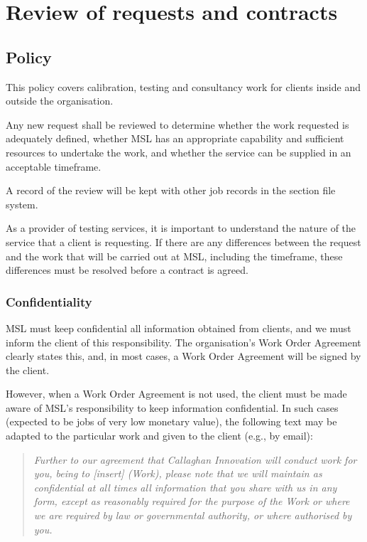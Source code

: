 \section{Review of requests and contracts}
\label{s:requests_and_tenders}
\subsection{Policy}
This policy covers calibration, testing and consultancy work for clients inside and outside the organisation.

Any new request shall be reviewed to determine whether the work requested is adequately defined, whether MSL has an appropriate capability and sufficient resources to undertake the work, and whether the service can be supplied in an acceptable timeframe.

A record of the review will be kept with other job records in the section file system.

As a provider of testing services, it is important to understand the nature of the service that a client is requesting. If there are any differences between the request and the work that will be carried out at MSL, including the timeframe, these differences must be resolved before a contract is agreed.

\subsubsection{Confidentiality}
\label{sss:confidentiality}
MSL must keep confidential all information obtained from clients, and we must inform the client of this responsibility. The organisation’s Work Order Agreement clearly states this, and, in most cases, a Work Order Agreement will be signed by the client. 

However, when a Work Order Agreement is not used, the client must be made aware of MSL’s responsibility to keep information confidential. In such cases (expected to be jobs of very low monetary value), the following text may be adapted to the particular work and given to the client (e.g., by email):
\begin{quote}
\textit{Further to our agreement that Callaghan Innovation will conduct work for you, being to [insert] (Work), please note that we will maintain as confidential at all times all information that you share with us in any form, except as reasonably required for the purpose of the Work or where we are required by law or governmental authority, or where authorised by you.}
\end{quote}


